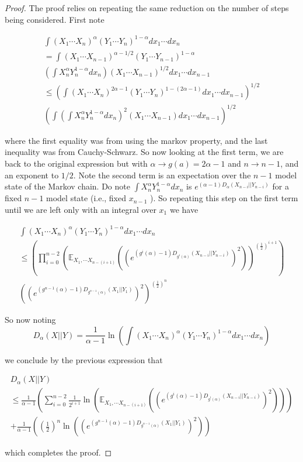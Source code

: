 \begin{proof}


The proof relies on repeating the same reduction on the number of steps being considered. First note 
    
\begin{multline}
    \int (X_1 \cdots X_n)^{\alpha} (Y_1 \cdots Y_n)^{1 - \alpha} dx_1 \cdots dx_n \\  = \int (X_1 \cdots X_{n-1})^{\alpha - 1/2} (Y_1 \cdots Y_{n-1})^{1 - \alpha}  \\ (\int X_n^{\alpha} Y_n^{1- \alpha} dx_n) (X_1 \cdots X_{n-1})^{1/2} dx_1 \cdots dx_{n-1}
    \\ \leq ( \int (X_1 \cdots X_n)^{2\alpha -1} (Y_1 \cdots Y_n)^{1 - (2\alpha-1)}  dx_1 \cdots dx_{n-1})^{1/2} \\ (\int (\int X_n^{\alpha} Y_n^{1- \alpha} dx_n)^2 (X_1 \cdots X_{n-1}) dx_1 \cdots dx_{n-1})^{1/2}
\end{multline}

where the first equality was from using the markov property, and the last inequality was from Cauchy-Schwarz. So now looking at the first term, we are back to the original expression but with $\alpha \rightarrow g(a) = 2\alpha -1$ and $n \rightarrow n-1$, and an exponent to $1/2$. Note the second term is an expectation over the $n-1$ model state of the Markov chain. Do note $\int X_n^{\alpha} Y_n^{1- \alpha} dx_n$ is $e^{(\alpha -1)D_{\alpha}(X_{n-i}|| Y_{n-i})}$ for a fixed $n-1$ model state (i.e., fixed $x_{n-1}$ ). So repeating this step on the first term until we are left only with an integral over $x_1$ we have

\begin{multline}
    \int (X_1 \cdots X_n)^{\alpha} (Y_1 \cdots Y_n)^{1 - \alpha} dx_1 \cdots dx_n \\  
    \leq (\prod_{i=0}^{n-2} (\mathbb{E}_{X_1,\cdots X_{n-(i+1)}}  ((e^{(g^{i}(\alpha) -1)D_{g^{i}(\alpha)}(X_{n-i}|| Y_{n-i})})^2))^{(\frac{1}{2})^{i+1}}) \\ ( (e^{(g^{n-1}(\alpha) -1)D_{g^{n-1}(\alpha)}(X_{1}|| Y_{1})})^2)^{(\frac{1}{2})^{n}}
\end{multline}

So now noting $$D_{\alpha}(X || Y) = \frac{1}{\alpha -1} \ln(\int (X_1 \cdots X_n)^{\alpha} (Y_1 \cdots Y_n)^{1 - \alpha} dx_1 \cdots dx_n)$$

we conclude by the previous expression that 

\begin{multline}
    D_{\alpha}(X || Y) \\ \leq \frac{1}{\alpha -1} (\sum_{i=0}^{n-2} \frac{1}{2^{i+1}} \ln (\mathbb{E}_{X_1,\cdots X_{n-(i+1)}}  ((e^{(g^{i}(\alpha) -1)D_{g^{i}(\alpha)}(X_{n-i}|| Y_{n-i})})^2))) \\ + \frac{1}{\alpha -1} ((\frac{1}{2})^{n} \ln ((e^{(g^{n-1}(\alpha) -1)D_{g^{n-1}(\alpha)}(X_{1}|| Y_{1})})^2)) 
\end{multline}

which completes the proof.

\end{proof}












